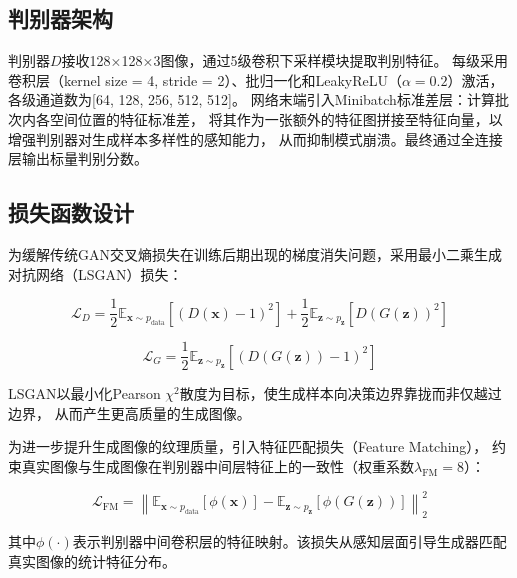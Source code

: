 \documentclass[12pt,a4paper]{ctexart}  %
\begin{document}
\subsection{判别器架构}

判别器$D$接收128×128×3图像，通过5级卷积下采样模块提取判别特征。
每级采用卷积层（kernel size = 4, stride = 2）、批归一化和LeakyReLU（$\alpha = 0.2$）激活，各级通道数为[64, 128, 256, 512, 512]。
网络末端引入Minibatch标准差层\cite{karras2018progressive}：计算批次内各空间位置的特征标准差，
将其作为一张额外的特征图拼接至特征向量，以增强判别器对生成样本多样性的感知能力，
从而抑制模式崩溃。最终通过全连接层输出标量判别分数。

\subsection{损失函数设计}

为缓解传统GAN交叉熵损失在训练后期出现的梯度消失问题，采用最小二乘生成对抗网络（LSGAN）损失\cite{mao2017lsgan}：

\begin{equation}
    \mathcal{L}_D = \frac{1}{2} \mathbb{E}_{\mathbf{x} \sim p_{\text{data}}}\left[(D(\mathbf{x}) - 1)^2\right]
    + \frac{1}{2} \mathbb{E}_{\mathbf{z} \sim p_{\mathbf{z}}}\left[D(G(\mathbf{z}))^2\right]
    \label{eq:lsgan_d}
\end{equation}

\begin{equation}
    \mathcal{L}_G = \frac{1}{2} \mathbb{E}_{\mathbf{z} \sim p_{\mathbf{z}}}\left[(D(G(\mathbf{z})) - 1)^2\right]
    \label{eq:lsgan_g}
\end{equation}

LSGAN以最小化Pearson $\chi^2$散度为目标，使生成样本向决策边界靠拢而非仅越过边界，
从而产生更高质量的生成图像\cite{mao2017lsgan}。

为进一步提升生成图像的纹理质量，引入特征匹配损失（Feature Matching）\cite{salimans2016improved}，
约束真实图像与生成图像在判别器中间层特征上的一致性（权重系数$\lambda_{\text{FM}} = 8$）：

\begin{equation}
    \mathcal{L}_{\text{FM}} = \left\| \mathbb{E}_{\mathbf{x} \sim p_{\text{data}}}[\phi(\mathbf{x})] - \mathbb{E}_{\mathbf{z} \sim p_{\mathbf{z}}}[\phi(G(\mathbf{z}))] \right\|_2^2
    \label{eq:fm}
\end{equation}

其中$\phi(\cdot)$表示判别器中间卷积层的特征映射。该损失从感知层面引导生成器匹配真实图像的统计特征分布。
\end{document}
